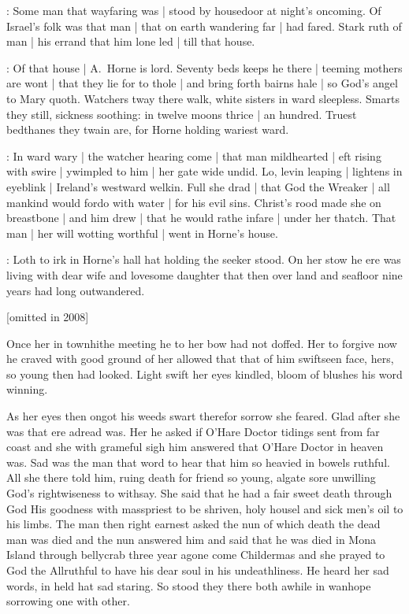 

:
Some man that wayfaring was |
stood by housedoor at night's oncoming.
Of Israel's folk was that man |
that on earth wandering far |
had fared.
Stark ruth of man |
his errand that him lone led |
till that house.


:
Of that house |
A.~Horne is lord.
Seventy beds keeps he there |
teeming mothers are wont |
that they lie for to thole |
and bring forth bairns hale |
so God's angel to Mary quoth.
Watchers tway there walk,
white sisters in ward sleepless.
Smarts they still,
sickness soothing:
in twelve moons thrice |
an hundred.
Truest bedthanes they twain are,
for Horne holding wariest ward.


:
In ward wary |
the watcher hearing come |
that man mildhearted |
eft rising with swire |
ywimpled to him |
her gate wide undid.
Lo,
levin leaping |
lightens in eyeblink |
Ireland's westward welkin.
Full she drad |
that God the Wreaker |
all mankind would fordo with water |
for his evil sins.
Christ's rood made she on breastbone |
and him drew |
that he would rathe infare |
under her thatch.
That man |
her will wotting worthful |
went in Horne's house.



:
Loth to irk in Horne's hall hat holding the seeker stood.
On her stow
he ere was living with dear wife and lovesome daughter that then over land
and seafloor nine years had long outwandered.

[omitted in 2008]

Once her in townhithe
meeting he to her bow had not doffed.
Her to forgive now he craved with
good ground of her allowed that that of him swiftseen face,
hers,
so young
then had looked.
Light swift her eyes kindled,
bloom of blushes his word
winning.


As her eyes then ongot his weeds swart therefor sorrow she feared.
Glad after she was that ere adread was.
Her he asked if O'Hare Doctor
tidings sent from far coast and she with grameful sigh him answered that
O'Hare Doctor in heaven was.
Sad was the man that word to hear that him
so heavied in bowels ruthful.
All she there told him,
ruing death for
friend so young,
algate sore unwilling God's rightwiseness to withsay.
She
said that he had a fair sweet death through God His goodness with
masspriest to be shriven,
holy housel and sick men's oil to his limbs.
The
man then right earnest asked the nun of which death the dead man was died
and the nun answered him and said that he was died in Mona Island through
bellycrab three year agone come Childermas and she prayed to God the
Allruthful to have his dear soul in his undeathliness.
He heard her sad
words,
in held hat sad staring.
So stood they there both awhile in wanhope
sorrowing one with other.

